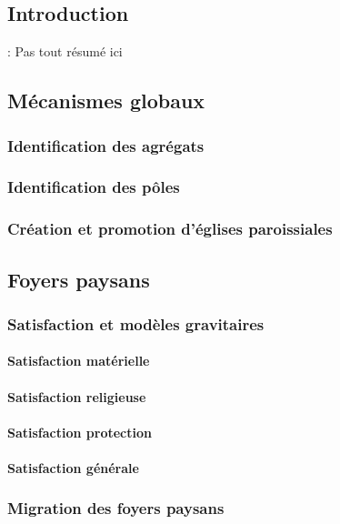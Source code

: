 \subsection{Introduction} : Pas tout résumé ici

\subsection{Mécanismes globaux}
	\subsubsection{Identification des agrégats \label{sssec:agregats}}
	\subsubsection{Identification des pôles \label{sssec:poles}}
	\subsubsection{Création et promotion d'églises paroissiales \label{sssec:paroisses}}

\subsection{Foyers paysans}
	\subsubsection{Satisfaction et modèles gravitaires \label{sssec:satisfaction}}
		\paragraph{Satisfaction matérielle}
		\paragraph{Satisfaction religieuse}
		\paragraph{Satisfaction protection}
		\paragraph{Satisfaction générale}
	\subsubsection{Migration des foyers paysans \label{sssec:migration}}
	
